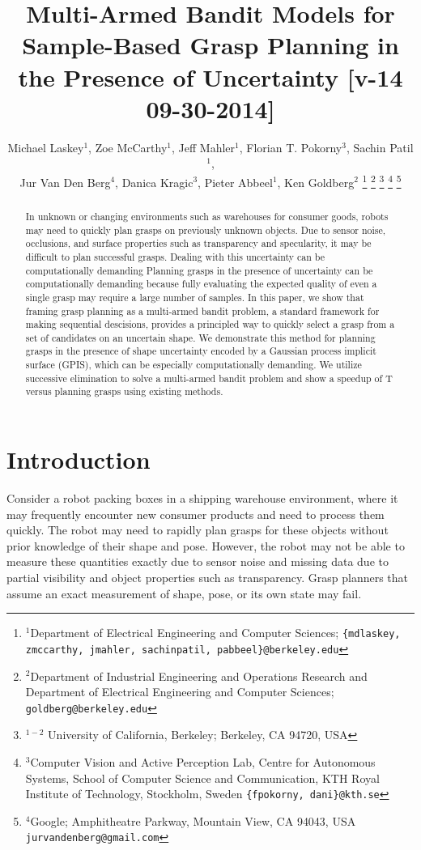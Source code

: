 \documentclass[letterpaper, 10 pt, conference]{ieeeconf}  %
\title{\LARGE \bf
Multi-Armed Bandit Models for Sample-Based Grasp Planning in the Presence of Uncertainty [v-14 09-30-2014]}
\author{Michael Laskey$^1$, Zoe McCarthy$^1$, Jeff Mahler$^1$, Florian T. Pokorny$^3$, Sachin Patil$^1$,\\ Jur Van Den Berg$^4$,  Danica Kragic$^3$, Pieter Abbeel$^1$, Ken Goldberg$^2$%
\thanks{$^1$Department of Electrical Engineering and Computer Sciences; {\tt\small \{mdlaskey, zmccarthy, jmahler, sachinpatil, pabbeel\}@berkeley.edu}}%
\thanks{$^2$Department of Industrial Engineering and Operations Research and Department of Electrical Engineering and Computer Sciences; {\tt\small goldberg@berkeley.edu}}%
\thanks{$^{1-2}$ University of California, Berkeley;  Berkeley, CA 94720, USA}%
\thanks{$^3$Computer Vision and Active Perception Lab, Centre for Autonomous Systems, School of Computer Science and Communication, KTH Royal Institute of Technology, Stockholm, Sweden {\tt\small \{fpokorny, dani\}@kth.se}}%
\thanks{$^4$Google; Amphitheatre Parkway, Mountain View, CA 94043, USA {\tt\small jurvandenberg@gmail.com}}%
}
\begin{document}
\maketitle
\thispagestyle{empty}
\pagestyle{empty}




\begin{abstract}
In unknown or changing environments such as warehouses for consumer goods, robots may need to quickly plan grasps on previously unknown objects.
Due to sensor noise, occlusions, and surface properties such as transparency and specularity, it may be difficult to plan successful grasps.
Dealing with this uncertainty can be computationally demanding
Planning grasps in the presence of uncertainty can be computationally demanding because fully evaluating the expected quality of even a single grasp may require a large number of samples.
In this paper, we show that framing grasp planning as a multi-armed bandit problem, a standard framework for making sequential descisions, provides a principled way to quickly select a grasp from a set of candidates on an uncertain shape.
We demonstrate this method for planning grasps in the presence of shape uncertainty encoded by a Gaussian process implicit surface (GPIS), which can be especially computationally demanding.
We utilize successive elimination to solve a multi-armed bandit problem and show a speedup of T versus planning grasps using existing methods.
\end{abstract}


\section{Introduction}



Consider a robot packing boxes in a shipping warehouse environment, where it may frequently encounter new consumer products and need to process them quickly.
The robot may need to rapidly plan grasps for these objects without prior knowledge of their shape and pose.
However, the robot may not be able to measure these quantities exactly due to sensor noise and missing data due to partial visibility and object properties such as transparency.
Grasp planners that assume an exact measurement of shape, pose, or its own state may fail.
\end{document}
